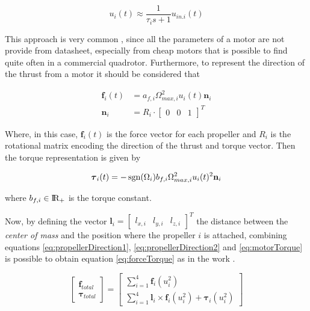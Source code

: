 \begin{equation}
	u_i(t) \approx \frac{1}{\tau_i s+1}u_{in.i}(t)
	\label{eq:motorDelay}
\end{equation}

\noindent This approach is very common \cite{motor}, since all the parameters of a motor are not provide from datasheet, especially from cheap motors that is possible to find quite often in a commercial quadrotor. Furthermore, to represent the direction of the thrust from a motor it should be considered that 

\begin{align}
	\mathbf{f}_i(t) &= a_{f,i} \Omega_{max,i}^2u_i(t)\mathbf{n}_i \label{eq:propellerDirection1} \\
	\mathbf{n}_i &= R_i \cdot 
	\begin{bmatrix} 
		0 & 0 & 1 
	\end{bmatrix}^T 
	\label{eq:propellerDirection2}
\end{align} 

\noindent Where, in this case, $\mathbf{f}_i(t)$ is the force vector for each propeller and $R_i$ is the rotational matrix encoding the direction of the thrust and torque vector. Then the torque representation is given by

\begin{equation}
	\boldsymbol{\tau}_i(t) = -\operatorname*{sgn}(\Omega_i)b_{f,i}\Omega_{max,i}^2u_i(t)^2\mathbf{n}_i
	\label{eq:motorTorque}
\end{equation}

\noindent where $b_{f,i} \in \rm I\!R_+$ is the torque constant.

\noindent Now, by defining the vector $\mathbf{l}_i = \begin{bmatrix} l_{x,i} & l_{y,i} & l_{z,i} \end{bmatrix}^T$ the distance between the \textit{center of mass} and the position where the propeller $i$ is attached, combining equations \eqref{eq:propellerDirection1}, \eqref{eq:propellerDirection2} and \eqref{eq:motorTorque} is possible to obtain equation \eqref{eq:forceTorque} as in the work \cite{modelIdentification}.

\begin{equation}
	\begin{bmatrix}
		\mathbf{f}_{total} \\
		\boldsymbol{\tau}_{total}
	\end{bmatrix}
	=
	\begin{bmatrix}
		\sum\limits_{i=1}^{4} \mathbf{f}_i(u_i^2) \\
		\sum\limits_{i=1}^{4} \mathbf{l}_i \times \mathbf{f}_i(u_i^2) + \boldsymbol{\tau}_i(u_i^2)
	\end{bmatrix}
	\label{eq:forceTorque}
\end{equation}

